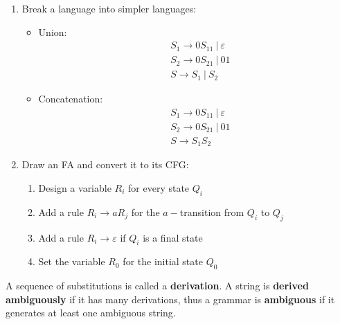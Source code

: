 \documentclass{article}
\begin{document}
\begin{enumerate}
    \item Break a language into simpler languages:
        \begin{itemize}
            \item Union: 
                \begin{align*}
                    &S_1 \rightarrow 0S_11 \ | \ \varepsilon \\
                    &S_2 \rightarrow 0S_21 \ | \ 01 \\ 
                    &S \rightarrow S_1 \ | \ S_2
                \end{align*}
            \item Concatenation:
                \begin{align*}
                    &S_1 \rightarrow 0S_11 \ | \ \varepsilon \\
                    &S_2 \rightarrow 0S_21 \ | \ 01 \\ 
                    &S \rightarrow S_1S_2
                \end{align*}
        \end{itemize}
        \newpage
    \item Draw an FA and convert it to its CFG:
        \begin{enumerate}
            \item Design a variable $R_i$ for every state $Q_i$
            \item Add a rule $R_i \rightarrow aR_j$ for the $a-$transition from $Q_i$ to $Q_j$
            \item Add a rule $R_i \rightarrow \varepsilon$ if $Q_i$ is a final state
            \item Set the variable $R_0$ for the initial state $Q_0$ 
        \end{enumerate}
\end{enumerate}
A sequence of substitutions is called a \textbf{derivation}. A string is \textbf{derived ambiguously} if it has many derivations, thus a grammar is \textbf{ambiguous} if it generates at least one ambiguous string.
\newpage
\end{document}
